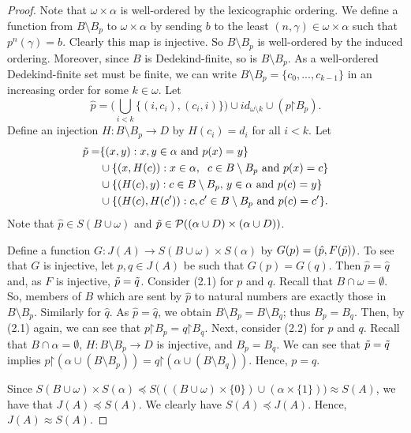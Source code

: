 \documentclass[a4paper,12pt,review]{article} %
\theoremstyle{definition}
\numberwithin{equation}{section}
\renewcommand{\restriction}{\mathord{\upharpoonright}}
\begin{document}
\begin{proof}
 
     Note that $\omega\times\alpha$ is well-ordered by the lexicographic ordering. We define a function from $B\setminus B_{p}$ to $\omega\times\alpha$ by sending $b$ to the least $(n,\gamma)\in\omega\times\alpha$ such that $p^{n}(\gamma)=b$. Clearly this map is injective. So $B\setminus B_{p}$ is well-ordered by the induced ordering. Moreover, since $B$ is Dedekind-finite, so is $B\setminus B_{p}$. As a well-ordered Dedekind-finite set must be finite, we can write $B\setminus B_{p}=\{c_{0},...,c_{k-1}\}$ in an increasing order for some $k\in\omega$. Let 
     \begin{equation}
         \hat{p}=\biggl(\bigcup_{i<k}\{(i,c_{i}),(c_{i},i)\}\biggr)\cup id_{\omega\setminus k}\cup (p\restriction B_{p}).
     \end{equation}
     Define an injection $H:B\setminus B_{p}\to D$ by $H(c_{i})=d_{i}$ for all $i<k$. Let \begin{equation}
       \begin{aligned}
         \Tilde{p}=&\{(x,y):x,y\in\alpha\text{ and }p(x)=y\}\\&\cup\{(x,H(c)):x\in\alpha,\hspace{0.2cm} c\in B\setminus B_{p}\text{ and }p(x)=c\}\\ 
        &\cup\{(H(c),y):c\in B\setminus B_{p},\hspace{0.05cm} y\in\alpha\text{ and }p(c)=y\}\\&\cup\{(H(c),H(c')):c,c'\in B\setminus B_{p}\text{ and }p(c)=c'\}.
    \end{aligned}
     \end{equation} Note that $\hat{p}\in S(B\cup\omega)$ and $\Tilde{p}\in \mathcal{P}((\alpha\cup D)\times(\alpha\cup D))$.

    Define a function $G:J(A)\to S(B\cup\omega) \times S(\alpha)$ by $G(p)=(\hat{p},F(\Tilde{p}))$. To see that $G$ is injective, let $p,q\in J(A)$ be such that $G(p)=G(q)$. Then $\hat{p}=\hat{q}$ and, as $F$ is injective, $\Tilde{p}=\Tilde{q}$. Consider (2.1) for $p$ and $q$. Recall that $B\cap\omega=\emptyset$. So, members of $B$ which are sent by $\hat{p}$ to natural numbers are exactly those in $B\setminus B_{p}$. Similarly for $\hat{q}$. As $\hat{p}=\hat{q}$, we obtain $B\setminus B_{p}=B\setminus B_{q}$; thus $B_{p}=B_{q}$. Then, by (2.1) again, we can see that $p\restriction B_{p}=q\restriction B_{q}$. Next, consider (2.2) for $p$ and $q$. Recall that $B\cap\alpha=\emptyset$, $H:B\setminus B_{p}\to D$ is injective, and $B_{p}=B_{q}$. We can see that $\Tilde{p}=\Tilde{q}$ implies $p\restriction (\alpha\cup(B\setminus B_{p}))=q\restriction (\alpha\cup(B\setminus B_{q}))$. Hence, $p=q$.

    Since $S(B\cup\omega) \times S(\alpha) \preceq S\bigl(((B\cup\omega)\times\{0\})\cup (\alpha\times\{1\})\bigr)\approx S(A)$, we have that $J(A)\preceq S(A)$. We clearly have $S(A)\preceq J(A)$. Hence, $J(A)\approx S(A)$.
\end{proof}
\end{document}
